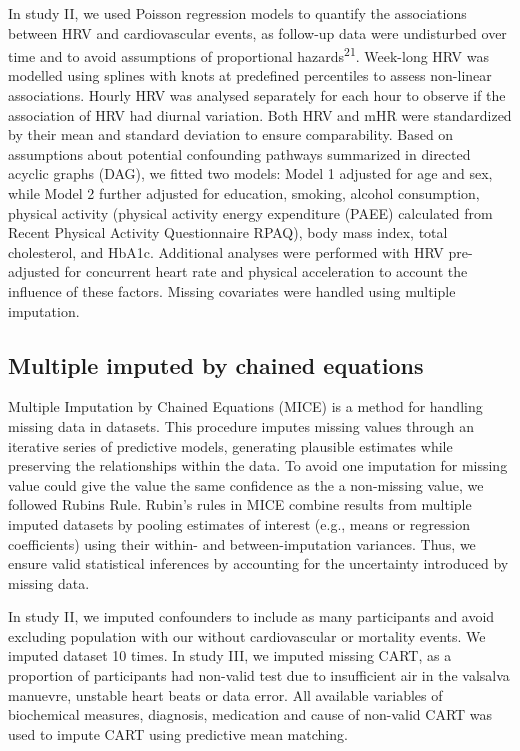 \documentclass[
  a4paper,
  headsepline=true,
  open=any]{scrbook}
\begin{document}
In study II, we used Poisson regression models to quantify the
associations between HRV and cardiovascular events, as follow-up data
were undisturbed over time and to avoid assumptions of proportional
hazards\textsuperscript{21}. Week-long HRV was modelled using splines
with knots at predefined percentiles to assess non-linear associations.
Hourly HRV was analysed separately for each hour to observe if the
association of HRV had diurnal variation. Both HRV and mHR were
standardized by their mean and standard deviation to ensure
comparability. Based on assumptions about potential confounding pathways
summarized in directed acyclic graphs (DAG), we fitted two models: Model
1 adjusted for age and sex, while Model 2 further adjusted for
education, smoking, alcohol consumption, physical activity (physical
activity energy expenditure (PAEE) calculated from Recent Physical
Activity Questionnaire RPAQ), body mass index, total cholesterol, and
HbA1c. Additional analyses were performed with HRV pre-adjusted for
concurrent heart rate and physical acceleration to account the influence
of these factors. Missing covariates were handled using multiple
imputation.

\hypertarget{multiple-imputed-by-chained-equations}{%
\subsection{Multiple imputed by chained
equations}\label{multiple-imputed-by-chained-equations}}

Multiple Imputation by Chained Equations (MICE) is a method for handling
missing data in datasets. This procedure imputes missing values through
an iterative series of predictive models, generating plausible estimates
while preserving the relationships within the data. To avoid one
imputation for missing value could give the value the same confidence as
the a non-missing value, we followed Rubins Rule. Rubin's rules in MICE
combine results from multiple imputed datasets by pooling estimates of
interest (e.g., means or regression coefficients) using their within-
and between-imputation variances. Thus, we ensure valid statistical
inferences by accounting for the uncertainty introduced by missing data.

In study II, we imputed confounders to include as many participants and
avoid excluding population with our without cardiovascular or mortality
events. We imputed dataset 10 times. In study III, we imputed missing
CART, as a proportion of participants had non-valid test due to
insufficient air in the valsalva manuevre, unstable heart beats or data
error. All available variables of biochemical measures, diagnosis,
medication and cause of non-valid CART was used to impute CART using
predictive mean matching.
\end{document}
